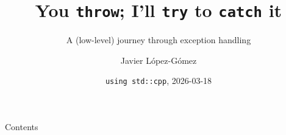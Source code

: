 \documentclass[final,hyperref={pdfpagemode=FullScreen},aspectratio=169,10pt]{beamer}
\title{You \texttt{throw}; I'll \texttt{try} to \texttt{catch} it}
\subtitle{A (low-level) journey through exception handling}
\author[Javier López-Gómez]{Javier López-Gómez}
\date{\texttt{using std::cpp}, 2026-03-18}
\begin{document}
\maketitle





\begin{frame}{Contents}
  \tableofcontents[hidesubsections]
\end{frame}








\makeendpage



\appendix
\end{document}
